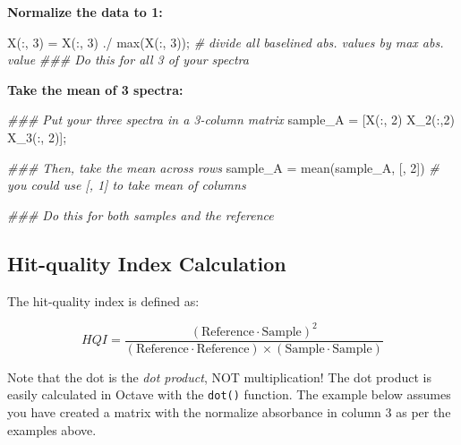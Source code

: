 \documentclass[]{tufte-book}
\newenvironment{Shaded}{}{}
\newcommand{\CommentTok}[1]{\textcolor[rgb]{0.38,0.63,0.69}{\textit{#1}}}
\newcommand{\FloatTok}[1]{\textcolor[rgb]{0.25,0.63,0.44}{#1}}
\newcommand{\FunctionTok}[1]{\textcolor[rgb]{0.02,0.16,0.49}{#1}}
\newcommand{\NormalTok}[1]{#1}
\newcommand{\OperatorTok}[1]{\textcolor[rgb]{0.40,0.40,0.40}{#1}}
\begin{document}
\textbf{Normalize the data to 1:}

\begin{Shaded}
\begin{Highlighting}[]
\NormalTok{X(}\OperatorTok{:,} \FloatTok{3}\NormalTok{) }\OperatorTok{=}\NormalTok{ X(}\OperatorTok{:,} \FloatTok{3}\NormalTok{) }\OperatorTok{./} \FunctionTok{max}\NormalTok{(X(}\OperatorTok{:,} \FloatTok{3}\NormalTok{))}\OperatorTok{;}  \CommentTok{# divide all baselined abs. values by max abs. value}
\CommentTok{### Do this for all 3 of your spectra}
\end{Highlighting}
\end{Shaded}

\textbf{Take the mean of 3 spectra:}

\begin{Shaded}
\begin{Highlighting}[]
\CommentTok{### Put your three spectra in a 3-column matrix}
\NormalTok{sample_A }\OperatorTok{=}\NormalTok{ [X(}\OperatorTok{:,} \FloatTok{2}\NormalTok{) X_2(}\OperatorTok{:,}\FloatTok{2}\NormalTok{) X_3(}\OperatorTok{:,} \FloatTok{2}\NormalTok{)]}\OperatorTok{;}

\CommentTok{### Then, take the mean across rows}
\NormalTok{sample_A }\OperatorTok{=} \FunctionTok{mean}\NormalTok{(sample_A}\OperatorTok{,}\NormalTok{ [}\OperatorTok{,} \FloatTok{2}\NormalTok{]) }\CommentTok{# you could use [, 1] to take mean of columns}

\CommentTok{### Do this for both samples and the reference}
\end{Highlighting}
\end{Shaded}

\hypertarget{hit-quality-index-calculation}{%
\subsection*{Hit-quality Index Calculation}\label{hit-quality-index-calculation}}

The hit-quality index is defined as:

\[
HQI = \frac{(\text{Reference} \cdot \text{Sample})^2}{(\text{Reference} \cdot \text{Reference}) \times (\text{Sample} \cdot \text{Sample})}
\]

Note that the dot is the \emph{dot product}, NOT multiplication! The dot product is easily calculated in Octave with the \texttt{dot()} function. The example below assumes you have created a matrix with the normalize absorbance in column 3 as per the examples above.
\end{document}
